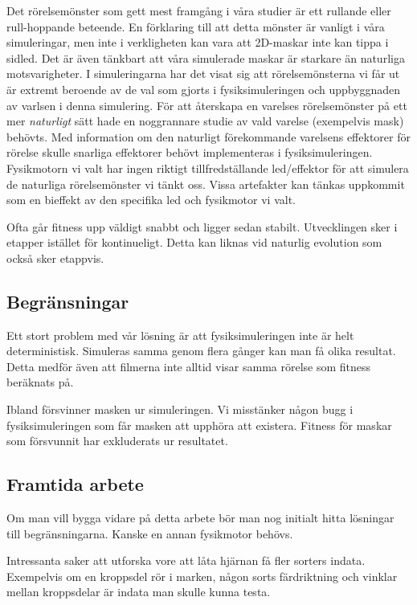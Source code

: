\documentclass[titlepage, twocolumn, a4paper, 12pt, swedish]{article}
\begin{document}
Det rörelsemönster som gett mest framgång i våra studier är ett rullande eller rull-hoppande beteende. En förklaring till att detta mönster är vanligt i våra simuleringar, men inte i verkligheten kan vara att 2D-maskar inte kan tippa i sidled. Det är även tänkbart att våra simulerade maskar är starkare än naturliga motsvarigheter. I simuleringarna har det visat sig att rörelsemönsterna vi får ut är extremt beroende av de val som gjorts i fysiksimuleringen och uppbyggnaden av varlsen i denna simulering. För att återskapa en varelses rörelsemönster på ett mer \textit{naturligt} sätt hade en noggrannare studie av vald varelse (exempelvis mask) behövts. Med information om den naturligt förekommande varelsens effektorer för rörelse skulle snarliga effektorer behövt implementeras i fysiksimuleringen. Fysikmotorn vi valt har ingen riktigt tillfredställande led/effektor för att simulera de naturliga rörelsemönster vi tänkt oss. Vissa artefakter kan tänkas uppkommit som en bieffekt av den specifika led och fysikmotor vi valt.

Ofta går fitness upp väldigt snabbt och ligger sedan stabilt. Utvecklingen sker i etapper istället för kontinueligt. Detta kan liknas vid naturlig evolution som också sker etappvis.

\subsection{Begränsningar}
Ett stort problem med vår lösning är att fysiksimuleringen inte är helt deterministisk. Simuleras samma genom flera gånger kan man få olika resultat. Detta medför även att filmerna inte alltid visar samma rörelse som fitness beräknats på. 

Ibland försvinner masken ur simuleringen. Vi misstänker någon bugg i fysiksimuleringen som får masken att upphöra att existera. Fitness för maskar som försvunnit har exkluderats ur resultatet. 

\subsection{Framtida arbete}
Om man vill bygga vidare på detta arbete bör man nog initialt hitta lösningar till begränsningarna. Kanske en annan fysikmotor behövs. 

Intressanta saker att utforska vore att låta hjärnan få fler sorters indata. Exempelvis om en kroppsdel rör i marken, någon sorts färdriktning och vinklar mellan kroppsdelar är indata man skulle kunna testa.
\end{document}
